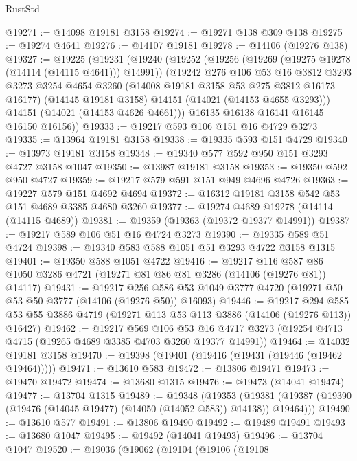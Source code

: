 \begin{lexlean}{RustStd}
\begin{coremodule}
@19271 := @14098 @19181 @3158
@19274 := @19271 @138 @309 @138
@19275 := @19274 @4641
@19276 := @14107 @19181
@19278 := @14106 (@19276 @138)
@19327 := @19225
    (@19231
      (@19240
        (@19252
          (@19256 (@19269 (@19275 @19278 (@14114 (@14115 @4641))) @14991))
          (@19242
            @276
            @106
            @53
            @16
            @3812
            @3293
            @3273
            @3254
            @4654
            @3260
            (@14008 @19181 @3158 @53 @275 @3812 @16173 @16177)
            (@14145 @19181 @3158)
            @14151
            (@14021 (@14153 @4655 @3293)))
          @14151
          (@14021 (@14153 @4626 @4661)))
        @16135
        @16138
        @16141
        @16145
        @16150
        @16156))
@19333 := @19217 @593 @106 @151 @16 @4729 @3273
@19335 := @13964 @19181 @3158
@19338 := @19335 @593 @151 @4729
@19340 := @13973 @19181 @3158
@19348 := @19340 @577 @592 @950 @151 @3293 @4727 @3158 @1047
@19350 := @13987 @19181 @3158
@19353 := @19350 @592 @950 @4727
@19359 := @19217 @579 @591 @151 @949 @4696 @4726
@19363 := @19227 @579 @151 @4692 @4694
@19372 := @16312 @19181 @3158 @542 @53 @151 @4689 @3385 @4680 @3260
@19377 := @19274 @4689 @19278 (@14114 (@14115 @4689))
@19381 := @19359 (@19363 (@19372 @19377 @14991))
@19387 := @19217 @589 @106 @51 @16 @4724 @3273
@19390 := @19335 @589 @51 @4724
@19398 := @19340 @583 @588 @1051 @51 @3293 @4722 @3158 @1315
@19401 := @19350 @588 @1051 @4722
@19416 := @19217
    @116
    @587
    @86
    @1050
    @3286
    @4721
    (@19271 @81 @86 @81 @3286 (@14106 (@19276 @81)) @14117)
@19431 := @19217
    @256
    @586
    @53
    @1049
    @3777
    @4720
    (@19271 @50 @53 @50 @3777 (@14106 (@19276 @50)) @16093)
@19446 := @19217
    @294
    @585
    @53
    @55
    @3886
    @4719
    (@19271 @113 @53 @113 @3886 (@14106 (@19276 @113)) @16427)
@19462 := @19217
    @569
    @106
    @53
    @16
    @4717
    @3273
    (@19254 @4713 @4715 (@19265 @4689 @3385 @4703 @3260 @19377 @14991))
@19464 := @14032 @19181 @3158
@19470 := @19398 (@19401 (@19416 (@19431 (@19446 (@19462 @19464)))))
@19471 := @13610 @583
@19472 := @13806 @19471
@19473 := @19470 @19472
@19474 := @13680 @1315
@19476 := @19473 (@14041 @19474)
@19477 := @13704 @1315
@19489 := @19348
    (@19353
      (@19381 (@19387 (@19390 (@19476 (@14045 @19477) (@14050 (@14052 @583)) @14138)) @19464)))
@19490 := @13610 @577
@19491 := @13806 @19490
@19492 := @19489 @19491
@19493 := @13680 @1047
@19495 := @19492 (@14041 @19493)
@19496 := @13704 @1047
@19520 := @19036
    (@19062
      (@19104
        (@19106
          (@19108

\end{coremodule}
\end{lexlean}

